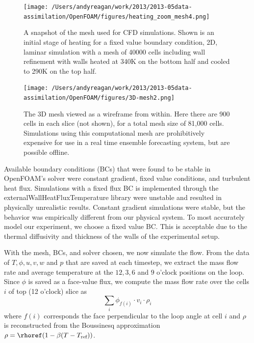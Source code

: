 \begin{figure}[t!]
  \centering
  \texttt{[image: /Users/andyreagan/work/2013/2013-05data-assimilation/OpenFOAM/figures/heating\_zoom\_mesh4.png]}
  \caption[A snapshot of the mesh used for CFD simulations]{
  A snapshot of the mesh used for CFD simulations.
  Shown is an initial stage of heating for a fixed value boundary condition, 2D, laminar simulation with a mesh of 40000 cells including wall refinement with walls heated at 340K on the bottom half and cooled to 290K on the top half.
  }
  \label{fig:CFDmesh1}
\end{figure}

\begin{figure}[t!]
  \centering
  \texttt{[image: /Users/andyreagan/work/2013/2013-05data-assimilation/OpenFOAM/figures/3D-mesh2.png]}
  \caption[The 3D mesh viewed as a wireframe from within]{
  The 3D mesh viewed as a wireframe from within.
  Here there are 900 cells in each slice (not shown), for a total mesh size of 81,000 cells.
  Simulations using this computational mesh are prohibitively expensive for use in a real time ensemble forecasting system, but are possible offline.
  }
  \label{fig:CFDmesh2}
\end{figure}

Available boundary conditions (BCs) that were found to be stable in OpenFOAM's solver were constant gradient, fixed value conditions, and turbulent heat flux.
Simulations with a fixed flux BC is implemented through the externalWallHeatFluxTemperature library were unstable and resulted in physically unrealistic results.
Constant gradient simulations were stable, but the behavior was empirically different from our physical system.
To most accurately model our experiment, we choose a fixed value BC.
This is acceptable due to the thermal diffusivity and thickness of the walls of the experimental setup.

With the mesh, BCs, and solver chosen, we now simulate the flow.
From the data of $T,\phi,u,v,w$ and $p$ that are saved at each timestep, we extract the mass flow rate and average temperature at the $12,3,6$ and $9$ o'clock positions on the loop.
Since $\phi$ is saved as a face-value flux, we compute the mass flow rate over the cells $i$ of top (12 o'clock) slice as
\begin{equation} \sum _i\phi_{f(i)} \cdot v_i \cdot \rho_i\end{equation}
where $f(i)$ corresponds the face perpendicular to the loop angle at cell $i$ and $\rho$ is reconstructed from the Boussinesq approximation $\rho = \rhoref (1-\beta(T-T_\text{ref}))$.

